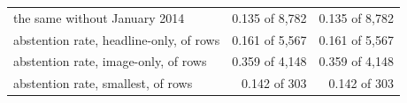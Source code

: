 \begin{tabular}{lrr}
the same without January 2014 & 0.135 of 8,782 & 0.135 of 8,782 \\
abstention rate, headline-only, of rows & 0.161 of 5,567 & 0.161 of 5,567 \\
abstention rate, image-only, of rows & 0.359 of 4,148 & 0.359 of 4,148 \\
abstention rate, smallest, of rows & 0.142 of 303 & 0.142 of 303 \\
\bottomrule
\end{tabular}
